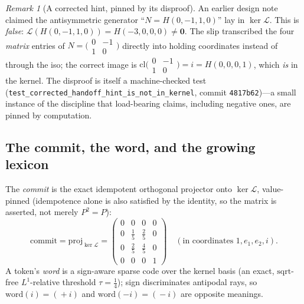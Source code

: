 \documentclass[11pt]{article}
\theoremstyle{plain}
\theoremstyle{definition}
\theoremstyle{remark}
\newtheorem{remark}[theorem]{Remark}
\newcommand{\Lop}{\mathcal{L}}
\newcommand{\VOID}{\mathbf{0}}
\begin{document}
\begin{remark}[A corrected hint, pinned by its disproof]\label{rem:disproof}
An earlier design note claimed the antisymmetric generator ``$N=H(0,-1,1,0)$'' lay in $\ker\Lop$. This is
\emph{false}: $\Lop(H(0,-1,1,0))=H(-3,0,0,0)\ne\VOID$. The slip transcribed the four \emph{matrix} entries of
$N=\big(\begin{smallmatrix}0&-1\\1&0\end{smallmatrix}\big)$ directly into holding coordinates instead of
through the iso; the correct image is $\mathrm{cl}\big(\begin{smallmatrix}0&-1\\1&0\end{smallmatrix}\big)=i=H(0,0,0,1)$,
which \emph{is} in the kernel. The disproof is itself a machine-checked test
(\texttt{test\_corrected\_handoff\_hint\_is\_not\_in\_kernel}, commit \texttt{4817b62})---a small instance of
the discipline that load-bearing claims, including negative ones, are pinned by computation.
\end{remark}

\subsection{The commit, the word, and the growing lexicon}
The \emph{commit} is the exact idempotent orthogonal projector onto $\ker\Lop$, value-pinned (idempotence
alone is also satisfied by the identity, so the matrix is asserted, not merely $P^2=P$):
\begin{equation}\label{eq:proj}
  \mathrm{commit}=\text{proj}_{\ker\Lop}=
  \begin{pmatrix}0&0&0&0\\0&\tfrac15&\tfrac25&0\\0&\tfrac25&\tfrac45&0\\0&0&0&1\end{pmatrix}
  \quad(\text{in coordinates }1,e_1,e_2,i).
\end{equation}
A token's \emph{word} is a sign-aware sparse code over the kernel basis (an exact, $\mathrm{sqrt}$-free
$L^1$-relative threshold $\tau=\tfrac14$); sign discriminates antipodal rays, so $\mathrm{word}(i)=(\!+i)$ and
$\mathrm{word}(-i)=(\!-i)$ are opposite meanings.
\end{document}
